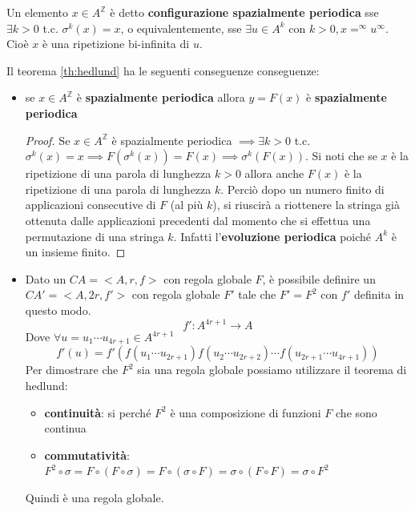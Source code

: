 \begin{definizione}
    Un elemento $x\in A^\mathbb{Z}$ è detto \textbf{configurazione spazialmente
        periodica} sse $\exists k>0 $ t.c. $\sigma^k(x) = x$, o equivalentemente, sse
    $\exists u\in A^k$ con $k>0, x = ^\infty u ^\infty$. Cioè $x$ è una ripetizione
    bi-infinita di $u$.
\end{definizione}

Il teorema \ref{th:hedlund} ha le seguenti conseguenze conseguenze:
\begin{itemize}
    \item se $x\in A^\mathbb{Z}$ è \textbf{spazialmente periodica} allora $y=F(x)$
          è  \textbf{spazialmente periodica}
          \begin{proof}
              Se $x\in A^\mathbb{Z}$  è spazialmente periodica $\implies\exists k>0$ t.c.
              $\sigma^k(x)=x \implies F(\sigma^k(x)) = F(x)\implies \sigma^k(F(x))$.
              Si noti che se $x$ è la ripetizione di una parola di lunghezza $k>0$ allora
              anche $F(x)$ è la ripetizione di una parola di lunghezza $k$. Perciò dopo
              un numero finito di applicazioni consecutive di $F$ (al più $k$), si riuscirà
              a riottenere la stringa già ottenuta dalle applicazioni precedenti dal momento
              che si effettua una permutazione di una stringa $k$. Infatti l'\textbf{evoluzione
                  periodica} poiché $A^k$ è un insieme finito.
          \end{proof}
    \item Dato un $CA = <A,r,f>$ con regola globale $F$, è possibile definire un  $CA '= <A,2r,f'>$
          con regola globale $F'$ tale che $F'=F^2$ con $f'$ definita in questo modo.
          $$f':A^{4r+1}\rightarrow A$$
          Dove $\forall u=u_1\cdots u_{4r+1}\in A^{4r+1}$
          $$f'(u) = f'(f(u_1\cdots u_{2r+1})f(u_{2}\cdots u_{2r+2})\cdots f(u_{2r+1}\cdots u_{4r+1}))$$
          Per dimostrare che $F^2$ sia una regola globale possiamo utilizzare il teorema di
          hedlund:
          \begin{itemize}
              \item \textbf{continuità}: si perché $F^2$ è una composizione di funzioni $F$ 
              che sono continua
              \item \textbf{commutatività}: $F^2\circ \sigma = F\circ (F\circ \sigma ) = F\circ (\sigma\circ F  ) = \sigma\circ (F\circ F  )  = \sigma \circ F^2$
          \end{itemize}
          Quindi è una regola globale.

\end{itemize}
